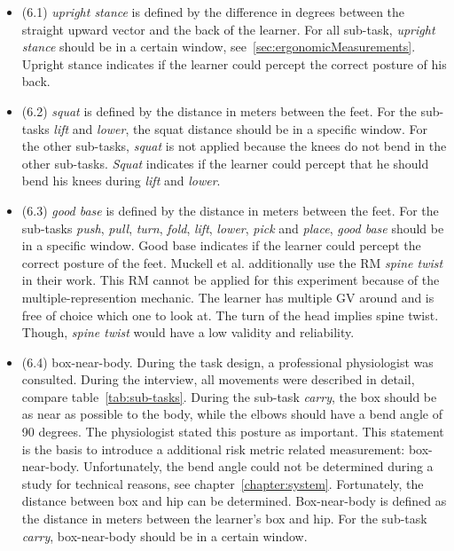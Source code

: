 \begin{itemize}
	\item[] (6.1) \textit{upright stance} is defined by the difference in degrees between the straight upward vector and the back of the learner. For all sub-task, \textit{upright stance} should be in a certain window, see~\ref{sec:ergonomicMeasurements}. Upright stance indicates if the learner could percept the correct posture of his back.
	
	\item[] (6.2) \textit{squat} is defined by the distance in meters between the feet. For the sub-tasks \textit{lift} and \textit{lower}, the squat distance should be in a specific window. For the other sub-tasks, \textit{squat} is not applied because the knees do not bend in the other sub-tasks. \textit{Squat} indicates if the learner could percept that he should bend his knees during \textit{lift} and \textit{lower}.
	
	\item[] (6.3) \textit{good base} is defined by the distance in meters between the feet. For the sub-tasks \textit{push}, \textit{pull}, \textit{turn}, \textit{fold}, \textit{lift}, \textit{lower}, \textit{pick} and \textit{place}, \textit{good base} should be in a specific window. Good base indicates if the learner could percept the correct posture of the feet.
	Muckell et al.\cite{muckell} additionally use the RM \textit{spine twist} in their work. This RM cannot be applied for this experiment because of the multiple-represention mechanic. The learner has multiple GV around and is free of choice which one to look at. The turn of the head implies spine twist. Though, \textit{spine twist} would have a low validity and reliability.
	
	\item[] (6.4) box-near-body. During the task design, a professional physiologist was consulted. During the interview, all movements were described in detail, compare table~\ref{tab:sub-tasks}. During the sub-task \textit{carry}, the box should be as near as possible to the body, while the elbows should have a bend angle of 90 degrees. The physiologist stated this posture as important. This statement is the basis to introduce a additional risk metric related measurement: box-near-body. Unfortunately, the bend angle could not be determined during a study for technical reasons, see chapter~\ref{chapter:system}. Fortunately, the distance between box and hip can be determined. Box-near-body is defined as the distance in meters between the learner's box and hip. For the sub-task \textit{carry}, box-near-body should be in a certain window.
\end{itemize}

